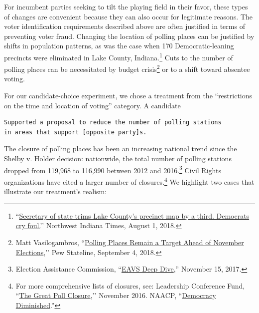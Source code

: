 \documentclass[12pt]{article}
\begin{document}
\begin{itemize}
\end{itemize}

For incumbent parties seeking to tilt the playing field in their favor, these types of changes are convenient because they can also occur for legitimate reasons. The voter identification requirements described above are often justified in terms of preventing voter fraud. Changing the location of polling places can be justified by shifts in population patterns, as was the case when 170 Democratic-leaning precincts were eliminated in Lake County, Indiana.\footnote{``\href{https://www.nwitimes.com/news/local/lake/update-secretary-of-state-trims-lake-county-s-precinct-map/article_3df5b288-c591-5b79-9014-4e94b137a3d5.html}{Secretary of state trims Lake County's precinct map by a third. Democrats cry foul.}’’ Northwest Indiana Times, August 1, 2018.} Cuts to the number of polling places can be necessitated by budget crisis\footnote{Matt Vasilogambros, ``\href{https://www.pewtrusts.org/en/research-and-analysis/blogs/stateline/2018/09/04/polling-places-remain-a-target-ahead-of-november-elections}{Polling Places Remain a Target Ahead of November Elections},’’ Pew Stateline, September 4, 2018.} or to a shift toward absentee voting.

For our candidate-choice experiment, we chose a treatment from the ``restrictions on the time and location of voting'' category. A candidate
\begin{center}
\begin{varwidth}{\linewidth}
\begin{verbatim}
Supported a proposal to reduce the number of polling stations
in areas that support [opposite party]s.
\end{verbatim}
\end{varwidth}
\end{center}

The closure of polling places has been an increasing national trend since the Shelby v. Holder decision: nationwide, the total number of polling stations dropped from 119,968 to 116,990 between 2012 and 2016.\footnote{Election Assistance Commission, ``\href{https://www.eac.gov/documents/2017/11/15/eavs-deep-dive-poll-workers-and-polling-places/}{EAVS Deep Dive},'' November 15, 2017.} Civil Rights organizations have cited a larger number of closures.\footnote{For more comprehensive lists of closures, see: Leadership Conference Fund, ``\href{http://civilrightsdocs.info/pdf/reports/2016/poll-closure-report-web.pdf}{The Great Poll Closure},’’ November 2016. NAACP, ``\href{https://www.naacpldf.org/wp-content/uploads/Democracy-Diminished-State-and-Local-Threats-to-Voting-Post-Shelby-County-Alabama-v.-Holder.pdf}{Democracy Diminished}.''} We highlight two cases that illustrate our treatment's realism:
\end{document}
